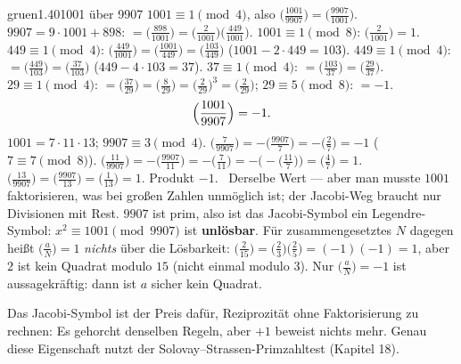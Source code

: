 \begin{loesungkarte}{gruen}{1.40}{1001 über 9907}
$1001\equiv1\pmod4$, also $\bigl(\frac{1001}{9907}\bigr) = \bigl(\frac{9907}{1001}\bigr)$. $9907 = 9\cdot1001 + 898$: $= \bigl(\frac{898}{1001}\bigr) = \bigl(\frac2{1001}\bigr)\bigl(\frac{449}{1001}\bigr)$. $1001\equiv1\pmod8$: $\bigl(\frac2{1001}\bigr) = 1$. $449\equiv1\pmod4$: $\bigl(\frac{449}{1001}\bigr) = \bigl(\frac{1001}{449}\bigr) = \bigl(\frac{103}{449}\bigr)$ ($1001 - 2\cdot449 = 103$). $449\equiv1\pmod4$: $= \bigl(\frac{449}{103}\bigr) = \bigl(\frac{37}{103}\bigr)$ ($449 - 4\cdot103 = 37$). $37\equiv1\pmod4$: $= \bigl(\frac{103}{37}\bigr) = \bigl(\frac{29}{37}\bigr)$. $29\equiv1\pmod4$: $= \bigl(\frac{37}{29}\bigr) = \bigl(\frac8{29}\bigr) = \bigl(\frac2{29}\bigr)^{3} = \bigl(\frac2{29}\bigr)$; $29\equiv5\pmod8$: $= -1$.
\[ \Bigl(\frac{1001}{9907}\Bigr) = -1 . \]
$1001 = 7\cdot11\cdot13$; $9907\equiv3\pmod4$. $\bigl(\frac7{9907}\bigr) = -\bigl(\frac{9907}7\bigr) = -\bigl(\frac27\bigr) = -1$ ($7\equiv7\pmod8$). $\bigl(\frac{11}{9907}\bigr) = -\bigl(\frac{9907}{11}\bigr) = -\bigl(\frac7{11}\bigr) = -\bigl(-\bigl(\frac{11}7\bigr)\bigr) = \bigl(\frac47\bigr) = 1$. $\bigl(\frac{13}{9907}\bigr) = \bigl(\frac{9907}{13}\bigr) = \bigl(\frac1{13}\bigr) = 1$. Produkt $-1$. \checkmark\ Derselbe Wert --- aber man musste $1001$ faktorisieren, was bei großen Zahlen unmöglich ist; der Jacobi-Weg braucht nur Divisionen mit Rest.
$9907$ ist prim, also ist das Jacobi-Symbol ein Legendre-Symbol: $x^{2}\equiv1001\pmod{9907}$ ist \textbf{unlösbar}. Für zusammengesetztes $N$ dagegen heißt $\bigl(\frac aN\bigr) = 1$ \emph{nichts} über die Lösbarkeit: $\bigl(\frac2{15}\bigr) = \bigl(\frac23\bigr)\bigl(\frac25\bigr) = (-1)(-1) = 1$, aber $2$ ist kein Quadrat modulo $15$ (nicht einmal modulo $3$). Nur $\bigl(\frac aN\bigr) = -1$ ist aussagekräftig: dann ist $a$ sicher kein Quadrat.
\begin{mitnehmen}\kastentext
Das Jacobi-Symbol ist der Preis dafür, Reziprozität ohne Faktorisierung zu rechnen: Es gehorcht denselben Regeln, aber $+1$ beweist nichts mehr. Genau diese Eigenschaft nutzt der Solovay--Strassen-Primzahltest (Kapitel 18).
\end{mitnehmen}
\end{loesungkarte}


